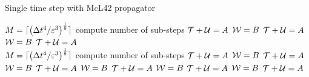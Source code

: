 \begin{algorithm}[ht]
	\caption{Single time step with McL42 propagator}
	\label{alg:mcl}
	\begin{algorithmic}
		\State
		\State
			\State $M = \lceil \left( \Delta t^4 / \varepsilon^3 \right)^{\frac{1}{8}} \rceil$
			\Comment compute number of sub-steps
			\State {}
			\Comment $\mathcal{T} + \mathcal{U} = A$
			\State {}
			\Comment $\mathcal{W} = B$
			\State {}
			\Comment $\mathcal{T} + \mathcal{U} = A$
			\State {}
			\Comment $\mathcal{W} = B$
			\State {}
			\Comment $\mathcal{T} + \mathcal{U} = A$
		\State
		\EndProcedure
			\\\hrulefill
		\State
		\State
			\State $M = \lceil \left( \Delta t^4 / \varepsilon^3 \right)^{\frac{1}{8}} \rceil$
			\Comment compute number of sub-steps
			\State {}
			\Comment $\mathcal{T} + \mathcal{U} = A$
			\State {}
			\Comment $\mathcal{W} = B$
			\State {}
			\Comment $\mathcal{T} + \mathcal{U} = A$
			\State {}
			\Comment $\mathcal{W} = B$
			\State {}
			\Comment $\mathcal{T} + \mathcal{U} = A$
			\State {}
			\Comment $\mathcal{W} = B$
			\State {}
			\Comment $\mathcal{T} + \mathcal{U} = A$
			\State {}
			\Comment $\mathcal{W} = B$
			\State {}
			\Comment $\mathcal{T} + \mathcal{U} = A$
			\State {}
			\Comment $\mathcal{W} = B$
			\State {}
			\Comment $\mathcal{T} + \mathcal{U} = A$
		\State
		\EndProcedure
	\end{algorithmic}
\end{algorithm}


